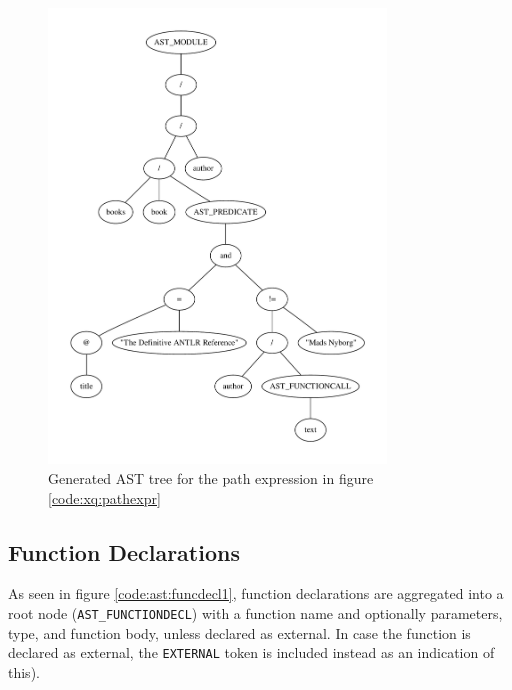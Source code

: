 \pagebreak
\begin{figure}[h!]

\caption{Path expression example, generates AST seen in figure \ref{tree:ast:pathexpr}}
\label{code:xq:pathexpr}
\centering
 \includegraphics[width=0.8\textwidth]{img/graphs/pathexpr}
\caption{Generated AST tree for the path expression in figure 
\ref{code:xq:pathexpr}}
\label{tree:ast:pathexpr}
\end{figure}

\subsection{Function Declarations}

As seen in figure \ref{code:ast:funcdecl1}, function declarations are aggregated
into a root node (\verb!AST_FUNCTIONDECL!) with a function name and optionally
parameters, type, and function body, unless declared as external. In case the
function is declared as external, the \verb!EXTERNAL! token is included instead
as an indication of this).


